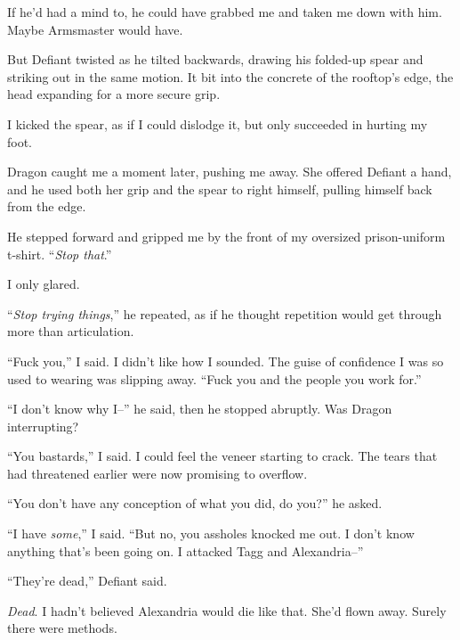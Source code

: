 If he'd had a mind to, he could have grabbed me and taken me down with him.  Maybe Armsmaster would have.



But Defiant twisted as he tilted backwards, drawing his folded-up spear and striking out in the same motion.  It bit into the concrete of the rooftop's edge, the head expanding for a more secure grip.



I kicked the spear, as if I could dislodge it, but only succeeded in hurting my foot.



Dragon caught me a moment later, pushing me away.  She offered Defiant a hand, and he used both her grip and the spear to right himself, pulling himself back from the edge.



He stepped forward and gripped me by the front of my oversized prison-uniform t-shirt.  ``\emph{Stop that}.''



I only glared.



``\emph{Stop trying things},'' he repeated, as if he thought repetition would get through more than articulation.



``Fuck you,'' I said.  I didn't like how I sounded.  The guise of confidence I was so used to wearing was slipping away.  ``Fuck you and the people you work for.''



``I don't know why I--'' he said, then he stopped abruptly.  Was Dragon interrupting?



``You bastards,'' I said.  I could feel the veneer starting to crack.  The tears that had threatened earlier were now promising to overflow.



``You don't have any conception of what you did, do you?'' he asked.



``I have \emph{some},'' I said.  ``But no, you assholes knocked me out.  I don't know anything that's been going on.  I attacked Tagg and Alexandria--''



``They're dead,'' Defiant said.



\emph{Dead}.  I hadn't believed Alexandria would die like that.  She'd flown away.  Surely there were methods.



